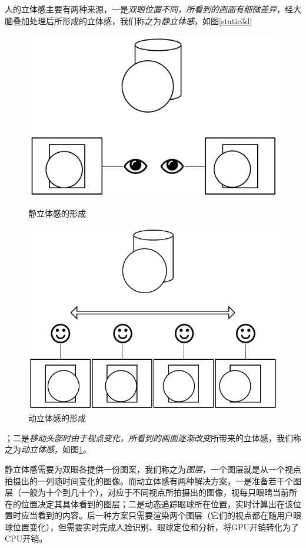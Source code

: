 \documentclass[12pt,a4paper]{article}
\begin{document}
人的立体感主要有两种来源，一是\emph{双眼位置不同，所看到的画面有细微差异}，经大脑叠加处理后所形成的立体感，我们称之为\emph{静立体感}，如图\ref{static3d}%
\begin{figure}[htbp]
\begin{minipage}[t]{0.5\linewidth}
    \centering
    \includegraphics[width=0.8\linewidth]{2}
    \caption{静立体感的形成}
    \label{static3d}
\end{minipage}
\begin{minipage}[t]{0.5\linewidth}
    \centering
    \includegraphics[width=0.8\linewidth]{3}
    \caption{动立体感的形成}
    \label{dynamic3d}
\end{minipage}
\end{figure}%
；二是\emph{移动头部时由于视点变化，所看到的画面逐渐改变}所带来的立体感，我们称之为\emph{动立体感}，如图\ref{dynamic3d}。

静立体感需要为双眼各提供一份图案，我们称之为\emph{图层}，一个图层就是从一个视点拍摄出的一列随时间变化的图像。而动立体感有两种解决方案，一是准备若干个图层（一般为十个到几十个），对应于不同视点所拍摄出的图像，视每只眼睛当前所在的位置决定其具体看到的图层；二是动态追踪眼球所在位置，实时计算出在该位置时应当看到的内容。后一种方案只需要渲染两个图层（它们的视点都在随用户眼球位置变化），但需要实时完成人脸识别、眼球定位和分析，将GPU开销转化为了CPU开销。
\end{document}

